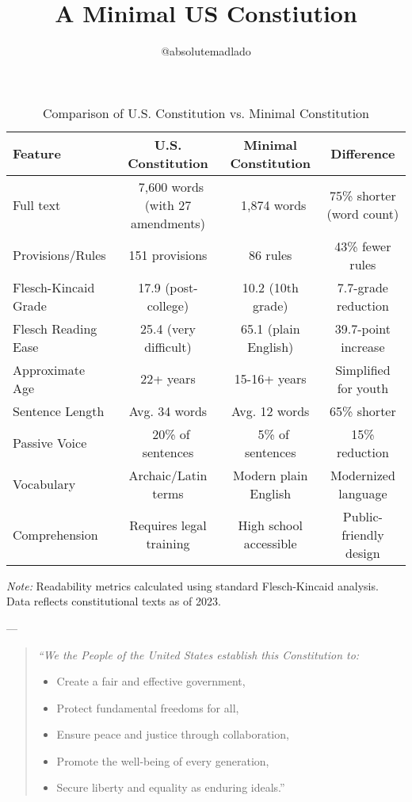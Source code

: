 \documentclass{article}
\title{A Minimal US Constiution}
\author{@absolutemadlado}
\begin{document}
\maketitle

\begin{table}[ht]
\centering
\caption{Comparison of U.S. Constitution vs. Minimal Constitution}
\label{tab:constitution-comp}
\begin{tabularx}{\textwidth}{lccc}
\toprule
\textbf{Feature} & \textbf{U.S. Constitution} & \textbf{Minimal Constitution} & \textbf{Difference} \\
\midrule
Full text & \multicolumn{1}{p{3cm}}{~7,600 words (with 27 amendments)} & \multicolumn{1}{p{3cm}}{~1,874 words} & 75\% shorter (word count) \\
Provisions/Rules & 151 provisions & 86 rules & 43\% fewer rules \\
Flesch-Kincaid Grade & 17.9 (post-college) & 10.2 (10th grade) & 7.7-grade reduction \\
Flesch Reading Ease & 25.4 (very difficult) & 65.1 (plain English) & 39.7-point increase \\
Approximate Age & 22+ years & 15-16+ years & Simplified for youth \\
Sentence Length & Avg. 34 words & Avg. 12 words & 65\% shorter \\
Passive Voice & ~20\% of sentences & ~5\% of sentences & 15\% reduction \\
Vocabulary & Archaic/Latin terms & Modern plain English & Modernized language \\
Comprehension & Requires legal training & High school accessible & Public-friendly design \\
\bottomrule
\end{tabularx}

\smallskip
\footnotesize
\textit{Note:} Readability metrics calculated using standard Flesch-Kincaid analysis. Data reflects constitutional texts as of 2023.
\end{table}
\newpage
---\begin{quote}
\itshape %
  ``We the People of the United States establish this Constitution to:
  \begin{itemize}[label=-, nosep, leftmargin=5em] %
	\item Create a fair and effective government,
	\item Protect fundamental freedoms for all,
	\item Ensure peace and justice through collaboration,
	\item Promote the well-being of every generation,
	\item Secure liberty and equality as enduring ideals.''
  \end{itemize}
\end{quote}
\end{document}
